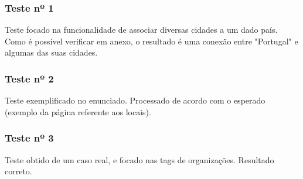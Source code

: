 \subsubsection{Teste nº 1}

Teste focado na funcionalidade de associar diversas cidades a um dado país. Como é possível verificar em anexo, o resultado é uma conexão entre "Portugal" e algumas das suas cidades.

\subsubsection{Teste nº 2}

Teste exemplificado no enunciado. Processado de acordo com o esperado (exemplo da página referente aos locais).

\subsubsection{Teste nº 3}

Teste obtido de um caso real, e focado nas tags de organizações. Resultado correto.












